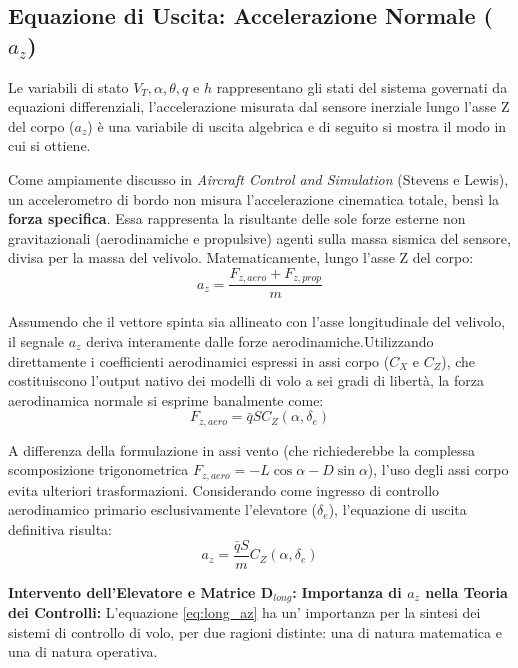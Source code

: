 \subsection*{Equazione di Uscita: Accelerazione Normale ($a_z$)}
Le variabili di stato $V_T, \alpha, \theta, q$ e $h$ rappresentano gli stati del sistema governati da equazioni differenziali, l'accelerazione misurata dal sensore inerziale lungo l'asse Z del corpo ($a_z$) è una variabile di uscita algebrica e di seguito si mostra il modo in cui si ottiene. 

Come ampiamente discusso in \textit{Aircraft Control and Simulation} (Stevens e Lewis)\cite{stevens2015aircraft}, un accelerometro di bordo non misura l'accelerazione cinematica totale, bensì la \textbf{forza specifica}. Essa rappresenta la risultante delle sole forze esterne non gravitazionali (aerodinamiche e propulsive) agenti sulla massa sismica del sensore, divisa per la massa del velivolo. Matematicamente, lungo l'asse Z del corpo:
\begin{equation}
	a_z = \frac{F_{z,aero} + F_{z,prop}}{m}
\end{equation}

Assumendo che il vettore spinta sia allineato con l'asse longitudinale del velivolo, il segnale $a_z$ deriva interamente dalle forze aerodinamiche.Utilizzando direttamente i coefficienti aerodinamici espressi in assi corpo ($C_X$ e $C_Z$), che costituiscono l'output nativo dei modelli di volo a sei gradi di libertà, la forza aerodinamica normale si esprime banalmente come:
\begin{equation*}
	F_{z,aero} = \bar{q} S C_Z(\alpha, \delta_e)
\end{equation*}

A differenza della formulazione in assi vento (che richiederebbe la complessa scomposizione trigonometrica $F_{z,aero} = -L \cos\alpha - D \sin\alpha$), l'uso degli assi corpo evita ulteriori trasformazioni. Considerando come ingresso di controllo aerodinamico primario esclusivamente l'elevatore ($\delta_e$), l'equazione di uscita definitiva risulta:
\begin{equation}
	a_z = \frac{\bar{q} S}{m} C_Z(\alpha, \delta_e) \label{eq:long_az}
\end{equation}



\textbf{Intervento dell'Elevatore e Matrice $\mathbf{D}_{long}$:}
\textbf{Importanza di $a_z$ nella Teoria dei Controlli:}
L'equazione \ref{eq:long_az} ha un' importanza per la sintesi dei sistemi di controllo di volo, per due ragioni distinte: una di natura matematica e una di natura operativa.

